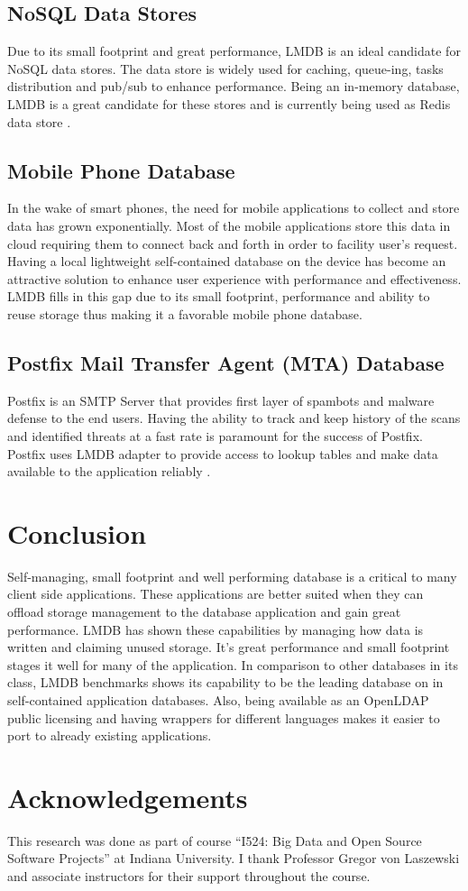 \documentclass[9pt,twocolumn,twoside]{../../styles/osajnl}
\begin{document}
\subsection{NoSQL Data Stores}

Due to its small footprint and great performance, LMDB is an ideal
candidate for NoSQL data stores. The data store is widely used for
caching, queue-ing, tasks distribution and pub/sub to enhance
performance. Being an in-memory database, LMDB is a great candidate
for these stores and is currently being used as Redis data store
\cite{www-kyoto}.

\subsection{Mobile Phone Database}

In the wake of smart phones, the need for mobile
applications to collect and store data has grown exponentially. Most
of the mobile applications store this data in cloud requiring them to
connect back and forth in order to facility user’s request. Having a
local lightweight self-contained database on the device has become an
attractive solution to enhance user experience with performance and
effectiveness. LMDB fills in this gap due to its small footprint,
performance and ability to reuse storage thus making it a favorable
mobile phone database.

\subsection{Postfix Mail Transfer Agent (MTA) Database}

Postfix is an SMTP Server that provides first layer of spambots and
malware defense to the end users. Having the ability to track and keep
history of the scans and identified threats at a fast rate is
paramount for the success of Postfix. Postfix uses LMDB adapter to
provide access to lookup tables and make data available to the
application reliably \cite{www-postfix}.

\section{Conclusion}

Self-managing, small footprint and well performing database is a
critical to many client side applications.  These applications are
better suited when they can offload storage management to the database
application and gain great performance. LMDB has shown these
capabilities by managing how data is written and claiming unused
storage. It’s great performance and small footprint stages it well for
many of the application. In comparison to other databases in its
class, LMDB benchmarks \cite{www-benchmark} shows its capability to be
the leading database on in self-contained application databases. Also,
being available as an OpenLDAP public licensing and having wrappers
for different languages makes it easier to port to already existing
applications.

\section*{Acknowledgements}
This research was done as part of course “I524: Big Data and Open
Source Software Projects” at Indiana University. I thank Professor
Gregor von Laszewski and associate instructors for their support
throughout the course.



 
\end{document}
